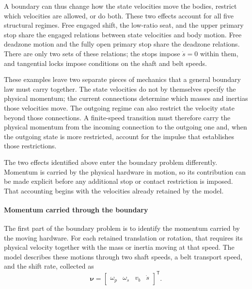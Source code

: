 \documentclass[11pt]{report}
\numberwithin{equation}{section}
\begin{document}
A boundary can thus change how the state velocities move the bodies,
restrict which velocities are allowed, or do both. These two effects
account for all five structural regimes. Free engaged shift, the
low-ratio seat, and the upper primary stop share the engaged relations
between state velocities and body motion. Free deadzone motion and the
fully open primary stop share the deadzone relations. There are only two
sets of these relations; the stops impose \(\dot s=0\) within them, and
tangential locks impose conditions on the shaft and belt speeds.

These examples leave two separate pieces of mechanics that a general boundary
law must carry together.  The state velocities do not by themselves specify the
physical momentum; the current connections determine which masses and inertias
those velocities move.  The outgoing regime can also restrict the velocity
state beyond those connections.  A finite-speed transition must therefore carry
the physical momentum from the incoming connection to the outgoing one and, when
the outgoing state is more restricted, account for the impulse that establishes
those restrictions.


The two effects identified above enter the boundary problem differently.
Momentum is carried by the physical hardware in motion, so its contribution can
be made explicit before any additional stop or contact restriction is imposed.
That accounting begins with the velocities already retained by the model.

\paragraph{Momentum carried through the boundary}

The first part of the boundary problem is to identify the momentum carried by
the moving hardware. For each retained translation or rotation, that requires
its physical velocity together with the mass or inertia moving at that speed.
The model describes these motions through two shaft speeds, a belt transport
speed, and the shift rate, collected as
\begin{equation}
    \boldsymbol{\nu}
    =
    \begin{bmatrix}
        \omega_p &
        \omega_s &
        v_b &
        \dot s
    \end{bmatrix}^{\mathsf T}.
    \label{eq:finite_event_velocity_vector}
\end{equation}
\end{document}
